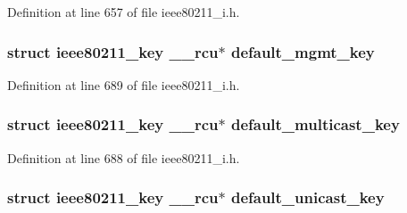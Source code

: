 Definition at line 657 of file ieee80211\-\_\-i.\-h.

\hypertarget{structieee80211__sub__if__data_a2919f5df0fee1d8bbeac082c448c77c3}{
\subsubsection[{default\-\_\-mgmt\-\_\-key}]{\setlength{\rightskip}{0pt plus 5cm}struct {\bf ieee80211\-\_\-key} \-\_\-\-\_\-rcu$\ast$ default\-\_\-mgmt\-\_\-key}}\label{structieee80211__sub__if__data_a2919f5df0fee1d8bbeac082c448c77c3}


Definition at line 689 of file ieee80211\-\_\-i.\-h.

\hypertarget{structieee80211__sub__if__data_a3b14deb6e926750564314ff8a32147ba}{
\subsubsection[{default\-\_\-multicast\-\_\-key}]{\setlength{\rightskip}{0pt plus 5cm}struct {\bf ieee80211\-\_\-key} \-\_\-\-\_\-rcu$\ast$ default\-\_\-multicast\-\_\-key}}\label{structieee80211__sub__if__data_a3b14deb6e926750564314ff8a32147ba}


Definition at line 688 of file ieee80211\-\_\-i.\-h.

\hypertarget{structieee80211__sub__if__data_a44b1d9794b9cb6b73af38c8c6258cfcf}{
\subsubsection[{default\-\_\-unicast\-\_\-key}]{\setlength{\rightskip}{0pt plus 5cm}struct {\bf ieee80211\-\_\-key} \-\_\-\-\_\-rcu$\ast$ default\-\_\-unicast\-\_\-key}}\label{structieee80211__sub__if__data_a44b1d9794b9cb6b73af38c8c6258cfcf}


